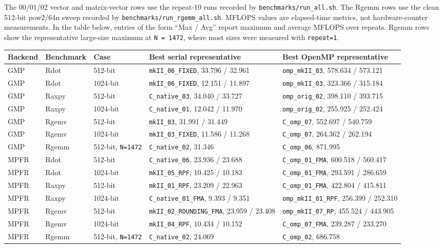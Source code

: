 \documentclass[11pt,a4paper]{article}
\newcommand{\code}[1]{\lstinline!#1!}
\begin{document}
The 00/01/02 vector and matrix-vector rows use the repeat-10 runs recorded by
\code{benchmarks/run_all.sh}. The Rgemm rows use the clean 512-bit pow2/64n sweep
recorded by \code{benchmarks/run_rgemm_all.sh}. MFLOPS values are elapsed-time
metrics, not hardware-counter measurements. In the table below, entries of the
form ``Max / Avg'' report maximum and average MFLOPS over repeats. Rgemm rows
show the representative large-size maximum at \code{N = 1472}, where most sizes
were measured with \code{repeat=1}.

\begingroup
\scriptsize
\begin{longtable}{@{}p{}p{}p{}p{}p{}@{}}
\toprule
Backend & Benchmark & Case & Best serial representative & Best OpenMP representative \\
\midrule
\endhead
GMP & Rdot & 512-bit &
\code{mkII_06_FIXED}, 33.796 / 32.961 &
\code{omp_mkII_03}, 578.634 / 573.121 \\
GMP & Rdot & 1024-bit &
\code{mkII_06_FIXED}, 12.151 / 11.897 &
\code{omp_mkII_03}, 323.366 / 315.184 \\
GMP & Raxpy & 512-bit &
\code{C_native_03}, 34.040 / 33.727 &
\code{omp_orig_02}, 398.110 / 393.715 \\
GMP & Raxpy & 1024-bit &
\code{C_native_01}, 12.042 / 11.970 &
\code{omp_orig_02}, 255.925 / 252.424 \\
GMP & Rgemv & 512-bit &
\code{mkII_03}, 31.991 / 31.449 &
\code{C_omp_07}, 552.697 / 540.759 \\
GMP & Rgemv & 1024-bit &
\code{mkII_03_FIXED}, 11.586 / 11.268 &
\code{C_omp_07}, 264.362 / 262.194 \\
GMP & Rgemm & 512-bit, \code{N=1472} &
\code{C_native_02}, 31.346 &
\code{C_omp_06}, 871.995 \\
\midrule
MPFR & Rdot & 512-bit &
\code{C_native_06}, 23.936 / 23.688 &
\code{C_omp_01_FMA}, 600.518 / 560.417 \\
MPFR & Rdot & 1024-bit &
\code{mkII_05_RPF}, 10.425 / 10.183 &
\code{C_omp_01_FMA}, 293.591 / 286.659 \\
MPFR & Raxpy & 512-bit &
\code{mkII_01_RPF}, 23.209 / 22.963 &
\code{C_omp_01_FMA}, 422.804 / 415.811 \\
MPFR & Raxpy & 1024-bit &
\code{C_native_01_FMA}, 9.393 / 9.351 &
\code{omp_mkII_01_RPF}, 256.399 / 252.310 \\
MPFR & Rgemv & 512-bit &
\code{mkII_02_ROUNDING_FMA}, 23.959 / 23.408 &
\code{omp_mkII_07_RP}, 455.524 / 443.905 \\
MPFR & Rgemv & 1024-bit &
\code{mkII_04_RPF}, 10.434 / 10.152 &
\code{C_omp_07_FMA}, 239.287 / 233.270 \\
MPFR & Rgemm & 512-bit, \code{N=1472} &
\code{C_native_02}, 24.069 &
\code{C_omp_02}, 686.758 \\
\bottomrule
\end{longtable}
\endgroup
\end{document}
